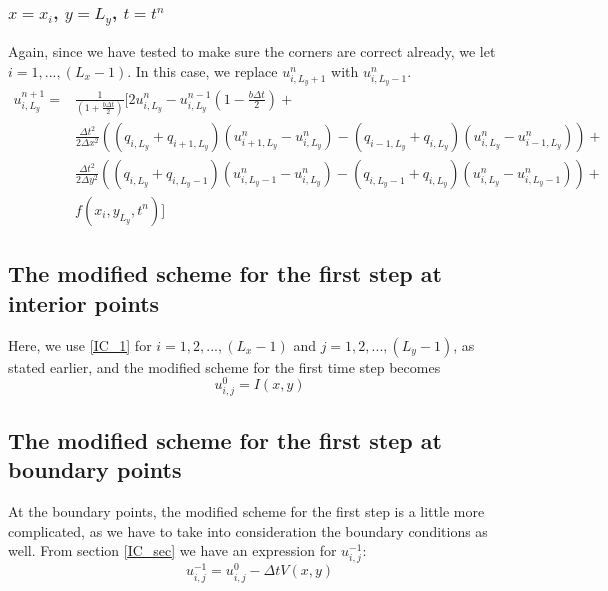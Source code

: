 \documentclass[11pt]{article} %
\newcommand{\Dx}{\Delta x}
\newcommand{\Dy}{\Delta y}
\newcommand{\Dt}{\Delta t}
\newcommand{\unp}{u^{n+1}}
\newcommand{\un}{u^{n}}
\newcommand{\unm}{u^{n-1}}
\begin{document}
\subsubsection{$x=x_i$, $y=L_y$, $t=t^n$}
Again, since we have tested to make sure the corners are correct already, we let $i=1,...,(L_x-1)$.
In this case, we replace $\un_{i,L_y+1}$ with $\un_{i,L_y-1}$.
\begin{align}
\unp_{i,L_y} = &\frac{1}{\left(1+\frac{b\Dt}{2}\right)}\bigg[ 2\un_{i,L_y} - \unm_{i,L_y}\left(1-\frac{b\Dt}{2}\right) +\nonumber\\
&\frac{\Dt^2}{2\Dx^2}\left((q_{i,L_y} + q_{i+1,L_y})(\un_{i+1,L_y}-\un_{i,L_y}) - (q_{i-1,L_y} + q_{i,L_y})(\un_{i,L_y}-\un_{i-1,L_y})\right) + \nonumber\\
&\frac{\Dt^2}{2\Dy^2}\left((q_{i,L_y} + q_{i,L_y-1})(\un_{i,L_y-1}-\un_{i,L_y}) - (q_{i,L_y-1} + q_{i,L_y})(\un_{i,L_y}-\un_{i,L_y-1})\right) +\nonumber\\
&f(x_i, y_{L_y}, t^n)\bigg]
\end{align}


\subsection*{The modified scheme for the first step at interior points}
Here, we use \eqref{IC_1} for $i = 1, 2, ..., (L_x-1)$ and $j = 1, 2, ..., (L_y-1)$, as stated earlier, and the modified scheme for the first time step becomes
\begin{equation}
u^0_{i,j} = I(x,y) \label{interior_IC}
\end{equation}


\subsection*{The modified scheme for the first step at boundary points}
At the boundary points, the modified scheme for the first step is a little more complicated, as we have to take into consideration the boundary conditions as well. From section \ref{IC_sec} we have an expression for $u^{-1}_{i,j}$:
\[u^{-1}_{i,j} = u^0_{i,j} - \Dt V(x,y)\]
\end{document}
